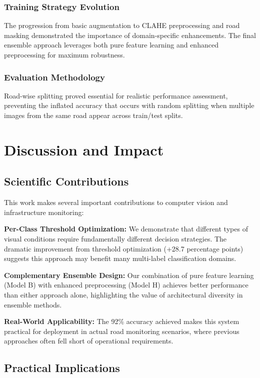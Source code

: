 \documentclass[12pt]{article}
\begin{document}
\subsubsection{Training Strategy Evolution}

The progression from basic augmentation to CLAHE preprocessing and road masking demonstrated the importance of domain-specific enhancements. The final ensemble approach leverages both pure feature learning and enhanced preprocessing for maximum robustness.

\subsubsection{Evaluation Methodology}

Road-wise splitting proved essential for realistic performance assessment, preventing the inflated accuracy that occurs with random splitting when multiple images from the same road appear across train/test splits.

\section{Discussion and Impact}

\subsection{Scientific Contributions}

This work makes several important contributions to computer vision and infrastructure monitoring:

\textbf{Per-Class Threshold Optimization:} We demonstrate that different types of visual conditions require fundamentally different decision strategies. The dramatic improvement from threshold optimization (+28.7 percentage points) suggests this approach may benefit many multi-label classification domains.

\textbf{Complementary Ensemble Design:} Our combination of pure feature learning (Model B) with enhanced preprocessing (Model H) achieves better performance than either approach alone, highlighting the value of architectural diversity in ensemble methods.

\textbf{Real-World Applicability:} The 92\% accuracy achieved makes this system practical for deployment in actual road monitoring scenarios, where previous approaches often fell short of operational requirements.

\subsection{Practical Implications}
\end{document}
